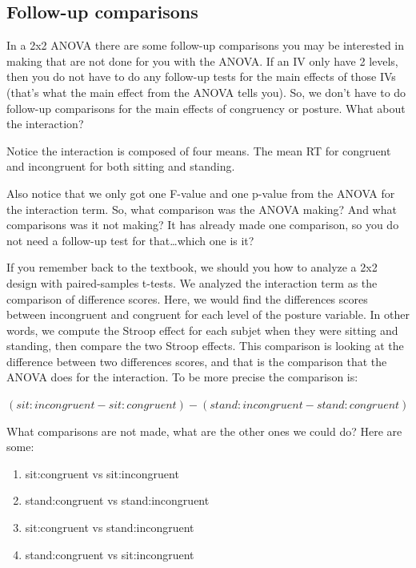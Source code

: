 \documentclass[
]{book}
\providecommand{\tightlist}{%
  \setlength{\itemsep}{0pt}\setlength{\parskip}{0pt}}
\begin{document}
\hypertarget{follow-up-comparisons-1}{%
\subsection{Follow-up comparisons}\label{follow-up-comparisons-1}}

In a 2x2 ANOVA there are some follow-up comparisons you may be interested in making that are not done for you with the ANOVA. If an IV only have 2 levels, then you do not have to do any follow-up tests for the main effects of those IVs (that's what the main effect from the ANOVA tells you). So, we don't have to do follow-up comparisons for the main effects of congruency or posture. What about the interaction?

Notice the interaction is composed of four means. The mean RT for congruent and incongruent for both sitting and standing.

Also notice that we only got one F-value and one p-value from the ANOVA for the interaction term. So, what comparison was the ANOVA making? And what comparisons was it not making? It has already made one comparison, so you do not need a follow-up test for that\ldots which one is it?

If you remember back to the textbook, we should you how to analyze a 2x2 design with paired-samples t-tests. We analyzed the interaction term as the comparison of difference scores. Here, we would find the differences scores between incongruent and congruent for each level of the posture variable. In other words, we compute the Stroop effect for each subjet when they were sitting and standing, then compare the two Stroop effects. This comparison is looking at the difference between two differences scores, and that is the comparison that the ANOVA does for the interaction. To be more precise the comparison is:

\((sit:incongruent - sit:congruent) - (stand:incongruent - stand:congruent)\)

What comparisons are not made, what are the other ones we could do? Here are some:

\begin{enumerate}
\def\labelenumi{\arabic{enumi}.}
\tightlist
\item
  sit:congruent vs sit:incongruent
\item
  stand:congruent vs stand:incongruent
\item
  sit:congruent vs stand:incongruent
\item
  stand:congruent vs sit:incongruent
\end{enumerate}
\end{document}
